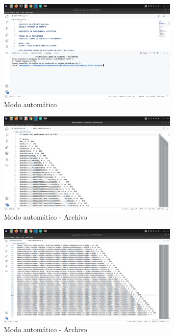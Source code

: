 \documentclass[11pt]{article} %
\begin{document}
	\newpage
	
	\begin{figure}[h]
		\centering
		\includegraphics[width=0.8\textwidth]{auto}
		\caption{Modo automático}
	\end{figure}
	
	\begin{figure}[h]
		\centering
		\includegraphics[width=0.8\textwidth]{arch3}
		\caption{Modo automático - Archivo}
	\end{figure}
	
	\newpage
	
	\begin{figure}[h]
		\centering
		\includegraphics[width=0.8\textwidth]{arch4}
		\caption{Modo automático - Archivo}
	\end{figure}
	
\end{document}
